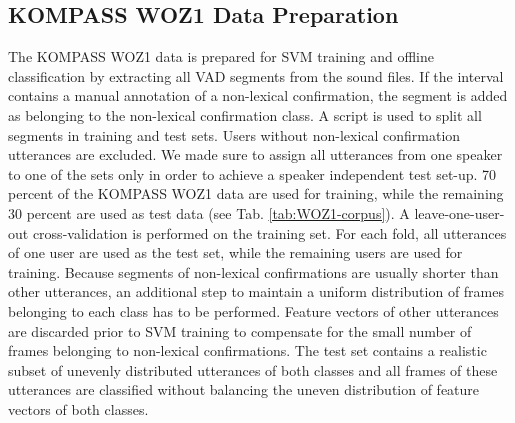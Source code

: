 \documentclass[letterpaper]{article}
\begin{document}
\subsection{KOMPASS WOZ1 Data Preparation}\label{sec:data-preparation}
The KOMPASS WOZ1 data is prepared for SVM training and offline classification by extracting all VAD segments from the sound files. 
If the interval contains a manual annotation of a non-lexical confirmation, the segment is added as belonging to the non-lexical confirmation class. 
A script is used to split all segments in training and test sets. Users without non-lexical confirmation utterances are excluded.
We made sure to assign all utterances from one speaker to one of the sets only in order to achieve a speaker independent test set-up.
70 percent of the KOMPASS WOZ1 data are used for training, while the remaining 30 percent are used as test data (see Tab. \ref{tab:WOZ1-corpus}).
A leave-one-user-out cross-validation is performed on the training set. For each fold, all utterances of one user are used as the test set, while the remaining users are used for training. 
Because segments of non-lexical confirmations are usually shorter than other utterances, an additional step to maintain a uniform distribution of frames belonging to each class has to be performed. Feature vectors of other utterances are discarded prior to SVM training to compensate for the small number of frames belonging to non-lexical confirmations.
The test set contains a realistic subset of unevenly distributed utterances of both classes and all frames of these utterances are classified without balancing the uneven distribution of feature vectors of both classes.
\end{document}
